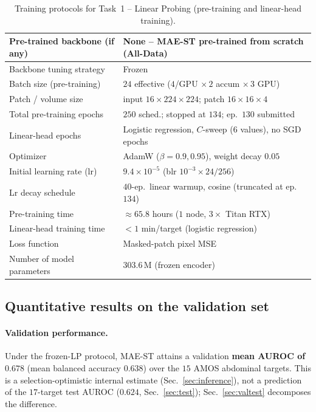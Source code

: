 \documentclass[runningheads]{llncs}
\begin{document}
\begin{table}[!htbp]
\caption{Training protocols for Task~1 -- Linear Probing (pre-training and
linear-head training).}
\label{table:training-lp}
\begin{center}
\begin{tabular}{ll}
\hline
Pre-trained backbone (if any)   & None -- MAE-ST pre-trained from scratch (All-Data) \\ \hline
Backbone tuning strategy        & Frozen \\ \hline
Batch size (pre-training)       & $24$ effective ($4$/GPU $\times\,2$ accum $\times\,3$ GPU) \\ \hline
Patch / volume size             & input $16\times224\times224$; patch $16\times16\times4$ \\ \hline
Total pre-training epochs       & $250$ sched.; stopped at $134$; ep.\ $130$ submitted \\ \hline
Linear-head epochs              & Logistic regression, $C$-sweep (6 values), no SGD epochs \\ \hline
Optimizer                       & AdamW ($\beta=0.9,0.95$), weight decay $0.05$ \\ \hline
Initial learning rate (lr)      & $9.4\times10^{-5}$ (blr $10^{-3}\times24/256$) \\ \hline
Lr decay schedule               & $40$-ep.\ linear warmup, cosine (truncated at ep.\ $134$) \\ \hline
Pre-training time               & $\approx 65.8$ hours ($1$ node, $3\times$ Titan RTX) \\ \hline
Linear-head training time       & $<1$ min/target (logistic regression) \\ \hline
Loss function                   & Masked-patch pixel MSE \\ \hline
Number of model parameters      & $303.6$\,M (frozen encoder) \\ \hline
\end{tabular}
\end{center}
\end{table}

\subsection{Quantitative results on the validation set}
\label{sec:valres}

\paragraph{Validation performance.}
Under the frozen-LP protocol, MAE-ST attains a validation \textbf{mean AUROC of
$0.678$} (mean balanced accuracy $0.638$) over the $15$ AMOS abdominal targets.
This is a selection-optimistic internal estimate (Sec.~\ref{sec:inference}), not
a prediction of the $17$-target test AUROC ($0.624$, Sec.~\ref{sec:test});
Sec.~\ref{sec:valtest} decomposes the difference.
\end{document}
